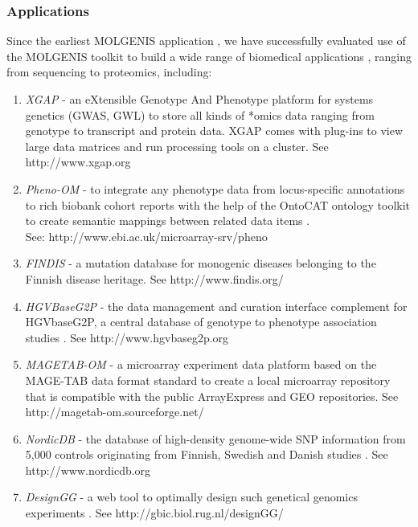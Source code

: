 \subsubsection{Applications}
Since the earliest MOLGENIS application \cite{Swertz:2004}, we have successfully evaluated use of the MOLGENIS 
toolkit to build a wide range of biomedical applications \cite{Swertz:2010a, Fredman:2002, Leu:2010, Li:2009, Smedley:2008}, 
ranging from sequencing to proteomics, including:

\begin{enumerate}\itemsep1pt
\item \emph{XGAP} - an eXtensible Genotype And Phenotype platform \cite{Swertz:2010a} for systems genetics 
(GWAS, GWL) to store all kinds of *omics data ranging from genotype to transcript and protein 
data. XGAP comes with plug-ins to view large data matrices and run processing tools on a cluster. 
See http://www.xgap.org
\item \emph{Pheno-OM} - to integrate any phenotype data from locus-specific annotations to 
rich biobank cohort reports with the help of the OntoCAT ontology toolkit to create semantic 
mappings between related data items \cite{Kurbatova:2011}.\\
See: http://www.ebi.ac.uk/microarray-srv/pheno
\item \emph{FINDIS} - a mutation database for monogenic diseases belonging to the Finnish 
disease heritage. See http://www.findis.org/
\item \emph{HGVBaseG2P} - the data management and curation interface complement for HGVbaseG2P, 
a central database of genotype to phenotype association studies \cite{Fredman:2002}. See http://www.hgvbaseg2p.org
\item \emph{MAGETAB-OM} - a microarray experiment data platform based on the MAGE-TAB data format 
standard to create a local microarray repository that is compatible with the public ArrayExpress 
and GEO repositories. See http://magetab-om.sourceforge.net/ 
\item \emph{NordicDB} - the database of high-density genome-wide SNP information from 5,000 
controls originating from Finnish, Swedish and Danish studies \cite{Leu:2010}. See http://www.nordicdb.org
\item \emph{DesignGG} - a web tool to optimally design such genetical genomics experiments \cite{Li:2009}. 
See http://gbic.biol.rug.nl/designGG/
\end{enumerate}

